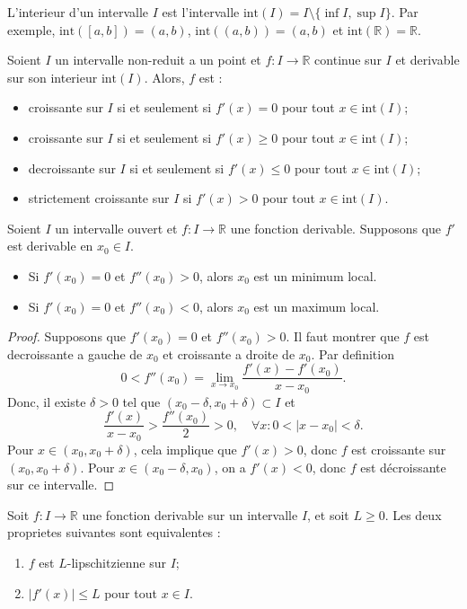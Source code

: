 \begin{definition}
L'interieur d'un intervalle $I$ est l'intervalle $\mathrm{int}(I)=I\setminus \{ \inf I, \sup I \}$. Par exemple, $\mathrm{int}([a,b])=(a,b)$, $\mathrm{int}((a,b))=(a,b)$ et $\mathrm{int}(\mathbb{R})=\mathbb{R}$.
\end{definition}
\begin{corollary}
Soient $I$ un intervalle non-reduit a un point et $f:I\to \mathbb{R}$ continue sur $I$ et derivable sur son interieur $\mathrm{int}(I)$. Alors, $f$ est :
\begin{itemize}
\item croissante sur $I$ si et seulement si $f'(x)=0$ pour tout $x \in \mathrm{int}(I)$;
\item croissante sur $I$ si et seulement si $f'(x)\ge 0$ pour tout $x \in \mathrm{int}(I)$;
\item decroissante sur $I$ si et seulement si $f'(x)\le 0$ pour tout $x \in \mathrm{int}(I)$;
\item strictement croissante sur $I$ si $f'(x)> 0$ pour tout $x \in \mathrm{int}(I)$.
\end{itemize}
\end{corollary}
\begin{proposition}
Soient $I$ un intervalle ouvert et $f:I\to \mathbb{R}$ une fonction derivable. Supposons que $f'$ est derivable en $x_{0}\in I$.
\begin{itemize}
\item Si $f'(x_{0})=0$ et $f''(x_{0})>0$, alors $x_{0}$ est un minimum local.
\item Si $f'(x_{0})=0$ et $f''(x_{0})<0$, alors $x_{0}$ est un maximum local.
\end{itemize}
\end{proposition}
\begin{proof}
Supposons que $f'(x_{0})=0$ et $f''(x_{0})>0$. Il faut montrer que $f$ est decroissante a gauche de $x_{0}$ et croissante a droite de $x_{0}$. Par definition
$$
0<f''(x_{0})=\lim_{ x \to x_{0} }  \frac{f'(x)-f'(x_{0})}{x-x_{0}}.
$$
Donc, il existe $\delta>0$ tel que $(x_{0}-\delta,x_{0}+\delta)\subset I$ et 
$$
\frac{f'(x)}{x-x_{0}}> \frac{f''(x_{0})}{2}>0,\quad \forall x:0<|x-x_{0}|<\delta.
$$
Pour $x \in(x_{0},x_{0}+\delta)$, cela implique que $f'(x)>0$, donc $f$ est croissante sur $(x_{0},x_{0}+\delta)$. Pour $x \in(x_{0}-\delta,x_{0})$, on a $f'(x)<0$, donc $f$ est décroissante sur ce intervalle.
\end{proof}
\begin{theorem}
Soit $f:I\to \mathbb{R}$ une fonction derivable sur un intervalle $I$, et soit $L\ge 0$. Les deux proprietes suivantes sont equivalentes :
\begin{enumerate}
\item $f$ est $L$-lipschitzienne sur $I$;
\item $|f'(x)|\le L$ pour tout $x \in I$.
\end{enumerate}
\end{theorem}
